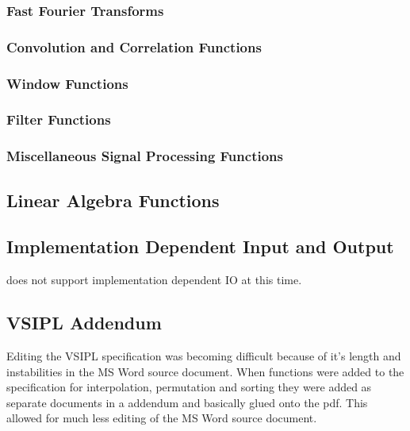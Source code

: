 \subsubsection*{Fast Fourier Transforms} 

%
\subsubsection*{Convolution and Correlation Functions} 

%
\subsubsection*{Window Functions} 

%
\subsubsection*{Filter Functions} 

%
\subsubsection*{Miscellaneous Signal Processing Functions} 

%
\subsection*{Linear Algebra Functions}
    
\subsection*{Implementation Dependent Input and Output}
    does not support implementation dependent IO at this time.
\subsection*{VSIPL Addendum}
Editing the VSIPL specification was becoming difficult because of it's length and instabilities in the MS Word source document. When functions were added to the specification for interpolation, permutation and sorting they were added as separate documents in a addendum and basically glued onto the pdf. This allowed for much less editing of the MS Word source document.
